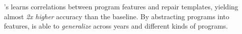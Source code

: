 \begin{framed}
  \noindent \toolname's learns correlations between program features and repair
  templates, yielding almost \emph{2x higher} accuracy than the baseline. By
  abstracting programs into features, \toolname is able to \emph{generalize}
  across years and different kinds of programs.
\end{framed}







